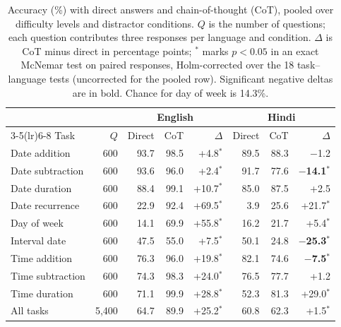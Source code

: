 \begin{table}[t]
\centering
\begin{tabular}{lrrrrrrr}
\toprule
 & & \multicolumn{3}{c}{English} & \multicolumn{3}{c}{Hindi} \\
\cmidrule(lr){3-5}\cmidrule(lr){6-8}
Task & $Q$ & Direct & CoT & $\Delta$ & Direct & CoT & $\Delta$ \\
\midrule
Date addition & 600 & 93.7 & 98.5 & +4.8$^{*}$ & 89.5 & 88.3 & $-$1.2\phantom{$^{*}$} \\
Date subtraction & 600 & 93.6 & 96.0 & +2.4$^{*}$ & 91.7 & 77.6 & \textbf{$-$14.1$^{*}$} \\
Date duration & 600 & 88.4 & 99.1 & +10.7$^{*}$ & 85.0 & 87.5 & +2.5\phantom{$^{*}$} \\
Date recurrence & 600 & 22.9 & 92.4 & +69.5$^{*}$ & 3.9 & 25.6 & +21.7$^{*}$ \\
Day of week & 600 & 14.1 & 69.9 & +55.8$^{*}$ & 16.2 & 21.7 & +5.4$^{*}$ \\
Interval date & 600 & 47.5 & 55.0 & +7.5$^{*}$ & 50.1 & 24.8 & \textbf{$-$25.3$^{*}$} \\
Time addition & 600 & 76.3 & 96.0 & +19.8$^{*}$ & 82.1 & 74.6 & \textbf{$-$7.5$^{*}$} \\
Time subtraction & 600 & 74.3 & 98.3 & +24.0$^{*}$ & 76.5 & 77.7 & +1.2\phantom{$^{*}$} \\
Time duration & 600 & 71.1 & 99.9 & +28.8$^{*}$ & 52.3 & 81.3 & +29.0$^{*}$ \\
\midrule
All tasks & 5,400 & 64.7 & 89.9 & +25.2$^{*}$ & 60.8 & 62.3 & +1.5$^{*}$ \\
\bottomrule
\end{tabular}
\caption{Accuracy (\%) with direct answers and chain-of-thought (CoT), pooled over difficulty levels and distractor conditions. $Q$ is the number of questions; each question contributes three responses per language and condition. $\Delta$ is CoT minus direct in percentage points; $^{*}$ marks $p<0.05$ in an exact McNemar test on paired responses, Holm-corrected over the 18 task--language tests (uncorrected for the pooled row). Significant negative deltas are in bold. Chance for day of week is 14.3\%.}
\label{tab:cot-delta}
\end{table}
